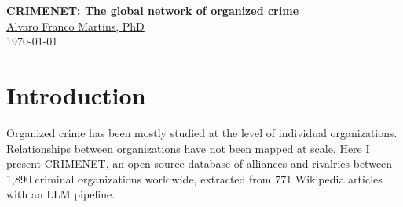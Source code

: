 \documentclass[11pt,a4paper]{article}
\begin{document}
\begin{center}
  {\LARGE\bfseries\sffamily
  CRIMENET: The global network of organized crime}\\[1.5em]
  {\large \href{https://alvarofrancomartins.com/}{Alvaro Franco Martins, PhD}}\\[0.75em]
  {\small\textcolor{accentgray}{\today}}
\end{center}

\begin{abstract}
\noindent
CRIMENET is an open-source database mapping the alliances and rivalries between criminal organizations worldwide. An LLM pipeline extracted 1{,}890 organizations and 3{,}354 relationships (2{,}293 alliances, 1{,}061 rivalries) from 771 Wikipedia articles. The alliance and rivalry networks are analyzed separately. The alliance network is larger and more cohesive (largest connected component covers 85\% of active organizations); the rivalry network is sparser and more fragmented but locally denser. Type assortativity is higher for rivalries than for alliances ($r = 0.64$ vs $0.49$): organizations fight within their own type more often than they cooperate within it. The deepest alliance shells are dominated by mafias, including the major American crime families; the deepest rivalry shells are dominated by gangs. Mafias are overwhelmingly cooperative: 86\% of their edges are alliances. Gangs sit at the opposite end: nearly half of their edges (45\%) are rivalries, the highest rivalry share of any type. Across the two layers, rivalry-dominant brokers are almost all gangs, whereas alliance-dominant brokers are type-mixed. The Hells Angels are the single most central organization in the networks, topping every centrality ranking in both networks.

\medskip
\noindent\textbf{Keywords:} criminal networks, network science, signed networks, organized crime, open-source intelligence, large language models
\end{abstract}

\section{Introduction}

Organized crime has been mostly studied at the level of individual organizations. Relationships between organizations have not been mapped at scale. Here I present CRIMENET, an open-source database of alliances and rivalries between 1{,}890 criminal organizations worldwide, extracted from 771 Wikipedia articles with an LLM pipeline. 
\end{document}
